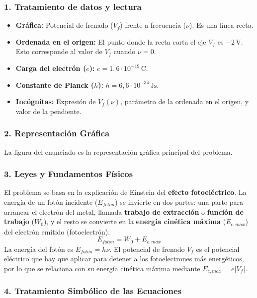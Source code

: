 \subsubsection*{1. Tratamiento de datos y lectura}
\begin{itemize}
    \item \textbf{Gráfica:} Potencial de frenado ($V_f$) frente a frecuencia ($\nu$). Es una línea recta.
    \item \textbf{Ordenada en el origen:} El punto donde la recta corta el eje $V_f$ es $-2\,\text{V}$. Esto corresponde al valor de $V_f$ cuando $\nu=0$.
    \item \textbf{Carga del electrón ($e$):} $e=1,6\cdot10^{-19}\,\text{C}$.
    \item \textbf{Constante de Planck ($h$):} $h=6,6\cdot10^{-34}\,\text{Js}$.
    \item \textbf{Incógnitas:} Expresión de $V_f(\nu)$, parámetro de la ordenada en el origen, y valor de la pendiente.
\end{itemize}

\subsubsection*{2. Representación Gráfica}
La figura del enunciado es la representación gráfica principal del problema.

\subsubsection*{3. Leyes y Fundamentos Físicos}
El problema se basa en la explicación de Einstein del \textbf{efecto fotoeléctrico}.
La energía de un fotón incidente ($E_{foton}$) se invierte en dos partes: una parte para arrancar el electrón del metal, llamada \textbf{trabajo de extracción} o \textbf{función de trabajo} ($W_0$), y el resto se convierte en la \textbf{energía cinética máxima} ($E_{c,max}$) del electrón emitido (fotoelectrón).
$$ E_{foton} = W_0 + E_{c,max} $$
La energía del fotón es $E_{foton} = h\nu$. El potencial de frenado $V_f$ es el potencial eléctrico que hay que aplicar para detener a los fotoelectrones más energéticos, por lo que se relaciona con su energía cinética máxima mediante $E_{c,max} = e|V_f|$.

\subsubsection*{4. Tratamiento Simbólico de las Ecuaciones}
